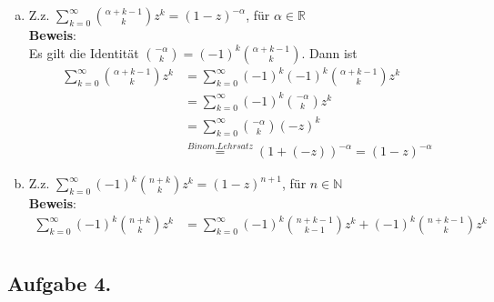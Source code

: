 \documentclass[11pt,a4paper,ngerman]{article}
\begin{document}
\begin{enumerate}[a)]
\item Z.z. $ \sum_{k=0}^\infty \binom{\alpha +k -1}{k} z^k = (1-z)^{-\alpha} $, für $\alpha \in \mathbb{R}$ \\

\textbf{Beweis}: \\
Es gilt die Identität $\binom{-\alpha}{k} = (-1)^k \binom{\alpha + k -1}{k}$. Dann ist
\begin{equation*}\begin{split}
\sum_{k=0}^\infty \binom{\alpha +k -1}{k} z^k
&= \sum_{k=0}^\infty (-1)^k (-1)^k \binom{\alpha +k -1}{k} z^k \\
&= \sum_{k=0}^\infty (-1)^k \binom{-\alpha}{k} z^k \\
&= \sum_{k=0}^\infty \binom{-\alpha}{k} (-z)^k \\
&\stackrel{Binom.Lehrsatz}{=} (1 + (-z))^{-\alpha} = (1 - z)^{-\alpha}
\end{split}\end{equation*}
\item Z.z. $\sum_{k=0}^\infty (-1)^k \binom{n+k}{k} z^k = (1-z)^{n+1}$, für $n \in \mathbb{N}$ \\

\textbf{Beweis}:
\begin{equation*}\begin{split}
\sum_{k=0}^\infty (-1)^k \binom{n+k}{k} z^k 
&= \sum_{k=0}^\infty (-1)^k \binom{n+k-1}{k-1} z^k + (-1)^k \binom{n+k-1}{k} z^k \\
\end{split}\end{equation*}

\end{enumerate}

\subsection*{Aufgabe 4.}


\label{LastPage}
\end{document}
